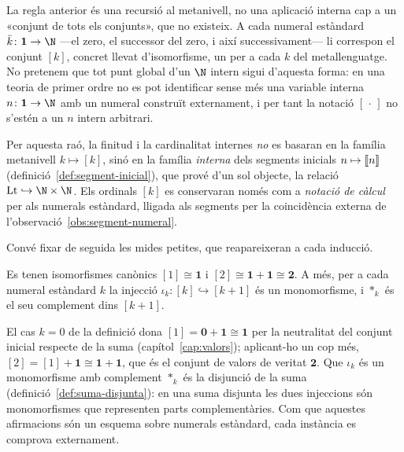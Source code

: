 \begin{observacio}\label{obs:ordinals-metanivell}
La regla anterior és una recursió al metanivell, no una aplicació interna
cap a un «conjunt de tots els conjunts», que no existeix. A cada numeral
estàndard \(\bar k\colon\mathbf1\to\N\) ---el zero, el successor del zero,
i així successivament--- li correspon el conjunt \([k]\), concret llevat
d'isomorfisme, un per a cada \(k\) del metallenguatge. No pretenem que tot
punt global d'un \(\N\) intern sigui d'aquesta forma: en una teoria de
primer ordre no es pot identificar sense més una variable interna
\(n\colon\mathbf1\to\N\) amb un numeral construït externament, i per tant la
notació \([\,\cdot\,]\) no s'estén a un \(n\) intern arbitrari.

Per aquesta raó, la finitud i la cardinalitat internes \emph{no} es
basaran en la família metanivell \(k\mapsto[k]\), sinó en la família
\emph{interna} dels segments inicials \(n\mapsto\llbracket n\rrbracket\)
(definició~\ref{def:segment-inicial}), que prové d'un sol objecte, la
relació \(\operatorname{Lt}\hookrightarrow\N\times\N\). Els ordinals
\([k]\) es conservaran només com a \emph{notació de càlcul} per als
numerals estàndard, lligada als segments per la coincidència externa de
l'observació~\ref{obs:segment-numeral}.
\end{observacio}

Convé fixar de seguida les mides petites, que reapareixeran a cada
inducció.

\begin{proposicio}\label{prop:ordinals-petits}
Es tenen isomorfismes canònics \([1]\cong\mathbf1\) i
\([2]\cong\mathbf1+\mathbf1\cong\mathbf2\). A més, per a cada numeral
estàndard \(k\) la injecció \(\iota_k\colon[k]\hookrightarrow[k+1]\) és un
monomorfisme, i \(\ast_k\) és el seu complement dins \([k+1]\).
\end{proposicio}

\begin{prova}
El cas \(k=0\) de la definició dona \([1]=\mathbf0+\mathbf1\cong\mathbf1\)
per la neutralitat del conjunt inicial respecte de la suma
(capítol~\ref{cap:valors}); aplicant-ho un cop més,
\([2]=[1]+\mathbf1\cong\mathbf1+\mathbf1\), que és el conjunt de valors de
veritat \(\mathbf2\). Que \(\iota_k\) és un monomorfisme amb complement
\(\ast_k\) és la disjunció de la suma (definició~\ref{def:suma-disjunta}):
en una suma disjunta les dues injeccions són monomorfismes que
representen parts complementàries. Com que aquestes afirmacions són un
esquema sobre numerals estàndard, cada instància es comprova externament.
\end{prova}

